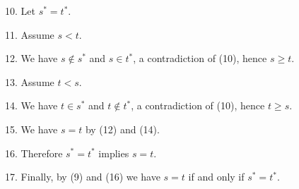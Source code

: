 \item{10.} Let $s^*=t^*$.

\item{11.} Assume $s<t$.
\item{12.} We have $s\not\in s^*$ and $s\in t^*$, a contradiction of (10), hence $s\ge t$.
\item{13.} Assume $t<s$.
\item{14.} We have $t\in s^*$ and $t\not\in t^*$, a contradiction of (10), hence $t\ge s$.
\item{15.} We have $s=t$ by (12) and (14).
\item{16.} Therefore $s^*=t^*$ implies $s=t$.

\item{17.} Finally, by (9) and (16) we have  $s=t$ if and only if $s^*=t^*$.



